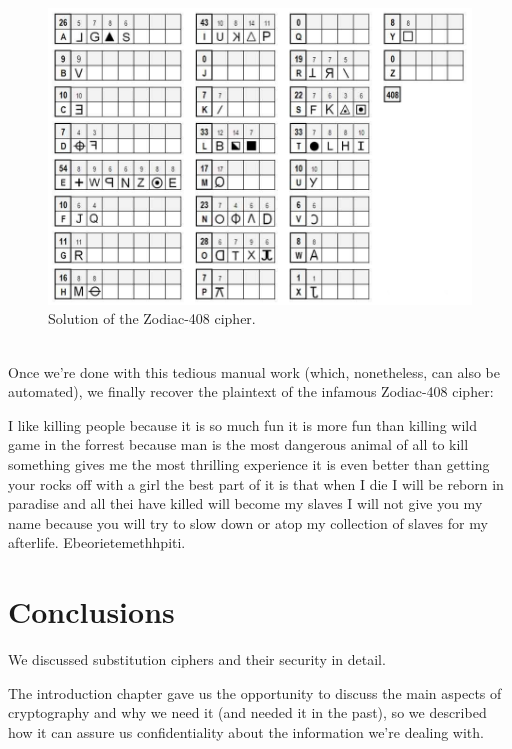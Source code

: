 \documentclass[Lau,binding=0.6cm,oneside]{sapthesis}
\begin{document}
\begin{figure}[H]
\includegraphics[scale=0.55]{zodiac_408_mapping}
\centering
\caption{Solution of the Zodiac-408 cipher.}
\centering
\end{figure}
\ \\
Once we're done with this tedious manual work (which, nonetheless, can also be automated), we finally recover the plaintext of the infamous Zodiac-408 cipher:\\
\begin{displayquote}{\small{\textsf{I like killing people because it is so much fun it is more fun than killing wild game in the forrest because man is the most dangerous animal of all to kill something gives me the most thrilling experience it is even better than getting your rocks off with a girl the best part of it is that when I die I will be reborn in paradise and all thei have killed will become my slaves I will not give you my name because you will try to slow down or atop my collection of slaves for my afterlife. Ebeorietemethhpiti.}}}
\end{displayquote}

\chapter*{Conclusions}
We discussed substitution ciphers and their security in detail.

The introduction chapter gave us the opportunity to discuss the main aspects of cryptography and why we need it (and needed it in the past), so we described how it can assure us confidentiality about the information we're dealing with.
\end{document}
